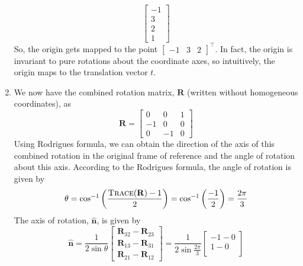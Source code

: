 \documentclass[10pt]{article}
\newcommand{\unit}[1]{\mathbf{\hat{#1}}}
\begin{document}
\begin{enumerate}
\begin{equation*}
\begin{bmatrix}
                -1 \\
                3 \\
                2 \\
                1
            \end{bmatrix}
        \end{equation*}
        So, the origin gets mapped to the point $\begin{bmatrix} -1 & 3 & 2 \end{bmatrix}^{\top}$.
        In fact, the origin is invariant to pure rotations about the coordinate axes, so intuitively,
        the origin maps to the translation vector $t$.

        \item We now have the combined rotation matrix, $\mathbf{R}$ (written without homogeneous
        coordinates), as
        \begin{equation*}
            \mathbf{R} = \begin{bmatrix}
                0 & 0 & 1 \\
                -1 & 0 & 0 \\
                0 & -1 & 0
            \end{bmatrix}
        \end{equation*}
        Using Rodrigues formula, we can obtain the direction of the axis of this combined
        rotation in the original frame of reference and the angle of rotation about this axis.
        According to the Rodrigues formula, the angle of rotation is given by
        \begin{equation*}
            \theta = \cos^{-1}{\left(\frac{\textsc{Trace}(\mathbf{R}) - 1}{2}\right)}
            = \cos^{-1}{\left(\frac{-1}{2}\right)} = \frac{2\pi}{3}
        \end{equation*}
        The axis of rotation, $\unit{n}$, is given by
        \begin{equation*}
            \unit{n} = \frac{1}{2\sin{\theta}} \begin{bmatrix}
                \mathbf{R}_{32} - \mathbf{R}_{23} \\
                \mathbf{R}_{13} - \mathbf{R}_{31} \\
                \mathbf{R}_{21} - \mathbf{R}_{12}
            \end{bmatrix}
            = \frac{1}{2\sin{\frac{2\pi}{3}}} \begin{bmatrix}
                -1 - 0 \\
                1 - 0 \\

\end{bmatrix}
\end{equation*}
\end{enumerate}
\end{document}
